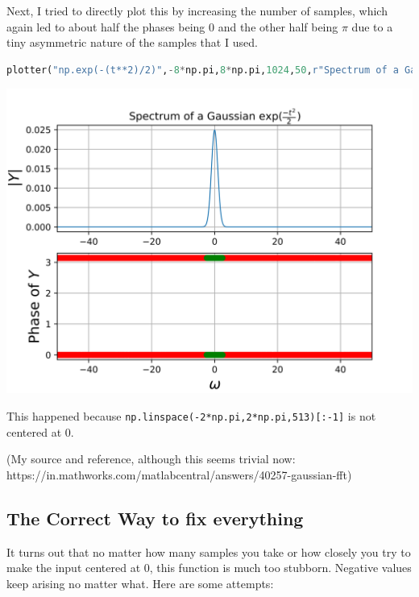 \documentclass[12pt]{article}
\begin{document}
Next, I tried to directly plot this by increasing the number of samples, which again led to about half the phases being 0 and the other half being $\pi$ due to a tiny asymmetric nature of the samples that I used.

\begin{lstlisting}[language=Python]
plotter("np.exp(-(t**2)/2)",-8*np.pi,8*np.pi,1024,50,r"Spectrum of a Gaussian $\exp(\frac{-t^2}{2})$",sig=False,save=True,fignum=8)
\end{lstlisting}

\begin{center}
    \includegraphics[scale=1]{images/fig11.png}
\end{center}

This happened because \texttt{np.linspace(-2*np.pi,2*np.pi,513)[:-1]}
is not centered at 0.

(My source and reference, although this seems trivial now: https://in.mathworks.com/matlabcentral/answers/40257-gaussian-fft)


\subsection{The Correct Way to fix everything}

It turns out that no matter how many samples you take or how closely you try to make the input centered at 0, this function is much too stubborn. Negative values keep arising no matter what.
\pagebreak
Here are some attempts:
\end{document}
